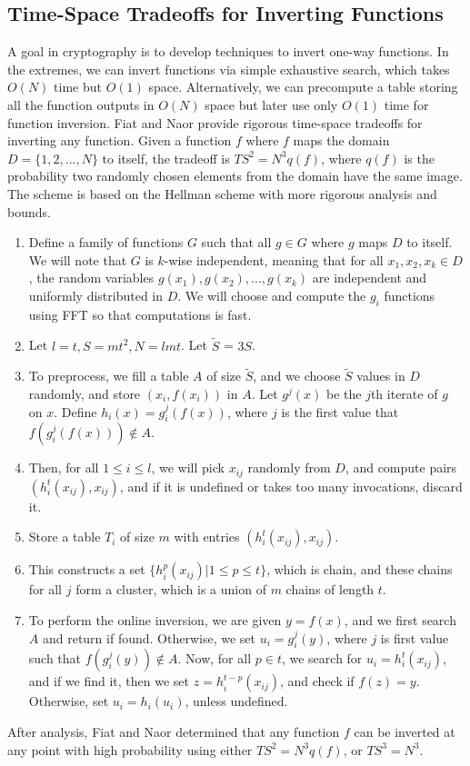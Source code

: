 \documentclass[12pt]{article}
\begin{document}
\subsection*{Time-Space Tradeoffs for Inverting Functions}
A goal in cryptography is to develop techniques to invert one-way functions. In the extremes, we can invert functions via simple exhaustive search, which takes $O(N)$ time but $O(1)$ space. Alternatively, we can precompute a table storing all the function outputs in $O(N)$ space but later use only $O(1)$ time for function inversion. Fiat and Naor provide rigorous time-space tradeoffs for inverting any function. Given a function $f$ where $f$ maps the domain $D = \{1,2,...,N\}$ to itself, the tradeoff is $TS^2 = N^3q(f)$, where $q(f)$ is the probability two randomly chosen elements from the domain have the same image. The scheme is based on the Hellman scheme with more rigorous analysis and bounds.
\begin{enumerate}
    \item Define a family of functions $G$ such that all $g \in G$ where $g$ maps $D$ to itself. We will note that $G$ is $k$-wise independent, meaning that for all $x_1, x_2, x_k \in D$, the random variables $g(x_1), g(x_2), ..., g(x_k)$ are independent and uniformly distributed in $D$. We will choose and compute the $g_i$ functions using FFT so that computations is fast.
    \item Let $l = t, S = mt^2, N = lmt$. Let $\tilde{S}$ = $3S$.
    \item To preprocess, we fill a table $A$ of size $\tilde{S}$, and we choose $\tilde{S}$ values in $D$ randomly, and store $(x_i, f(x_i))$ in $A$. Let $g^j(x)$ be the $j$th iterate of $g$ on $x$. Define $h_i(x) = g_i^j(f(x))$, where $j$ is the first value that $f(g_i^j(f(x))) \notin A$.
    \item Then, for all $1 \leq i \leq l$, we will pick $x_{ij}$ randomly from $D$, and compute pairs $(h^t_i(x_{ij}),x_{ij})$, and if it is undefined or takes too many invocations, discard it.
    \item Store a table $T_i$ of size $m$ with entries $(h^t_i(x_{ij}),x_{ij})$.
    \item This constructs a set $\{h^p_i(x_{ij})| 1\leq p\leq t\}$, which is chain, and these chains for all $j$ form a cluster, which is a union of $m$ chains of length $t$.
    \item To perform the online inversion, we are given $y=f(x)$, and we first search $A$ and return if found. Otherwise, we set $u_i = g_i^j(y)$, where $j$ is first value such that $f(g_i^j(y)) \notin A$. Now, for all $p \in t$, we search for $u_i=h_i^t(x_{ij})$, and if we find it, then we set $z = h_i^{t-p}(x_{ij})$, and check if $f(z) = y$. Otherwise, set $u_i = h_i(u_i)$, unless undefined.
\end{enumerate}
After analysis, Fiat and Naor determined that any function $f$ can be inverted at any point with high probability using either $TS^2 = N^3q(f)$, or $TS^3 = N^3$.
\end{document}
